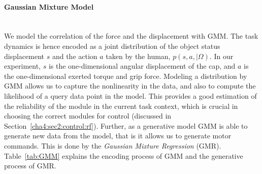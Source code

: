 
\paragraph{Gaussian Mixture Model} ~\\
We model the correlation of the force and the displacement with
GMM. The task dynamics is hence encoded as a joint distribution of the object status displacement $s$ and the action $a$ taken by the human, $p(s,a,{\mid}{\Omega})$. In our experiment, $s$ is the one-dimensional angular displacement of the cap, and $a$ is the one-dimensional exerted torque and grip force.
Modeling a distribution by GMM allows us to capture the nonlinearity in the data, and also to compute the likelihood of a query data point in the model. This provides a good estimation of the reliability of the module in the current task context, which is crucial in choosing the correct modules for control  (discussed in Section~\ref{cha4:sec2:control:rf}).
Further, as a generative model GMM is able to
generate new data from the model, that is it allows us to generate motor commands. This is done by the {\em Gaussian Mixture Regression} (GMR). Table~\ref{tab:GMM} explains the encoding process of GMM and the generative process of GMR.

